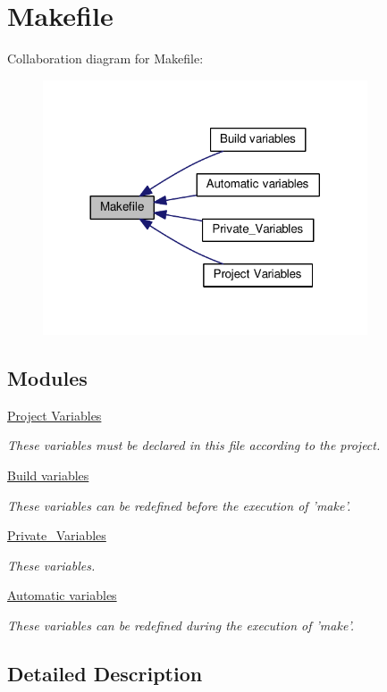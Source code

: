 \hypertarget{group___makefile}{\section{Makefile}
\label{group___makefile}
}
Collaboration diagram for Makefile\+:
\nopagebreak
\begin{figure}[H]
\begin{center}
\leavevmode
\includegraphics[width=272pt]{group___makefile}
\end{center}
\end{figure}
\subsection*{Modules}
\begin{DoxyCompactItemize}
\item 
\hyperlink{group___project___variables}{Project Variables}
\begin{DoxyCompactList}\small\item\em These variables must be declared in this file according to the project. \end{DoxyCompactList}\item 
\hyperlink{group___build___variables}{Build variables}
\begin{DoxyCompactList}\small\item\em These variables can be redefined before the execution of 'make'. \end{DoxyCompactList}\item 
\hyperlink{group___private___variables}{Private\+\_\+\+Variables}
\begin{DoxyCompactList}\small\item\em These variables. \end{DoxyCompactList}\item 
\hyperlink{group___automatic___variables}{Automatic variables}
\begin{DoxyCompactList}\small\item\em These variables can be redefined during the execution of 'make'. \end{DoxyCompactList}\end{DoxyCompactItemize}


\subsection{Detailed Description}
